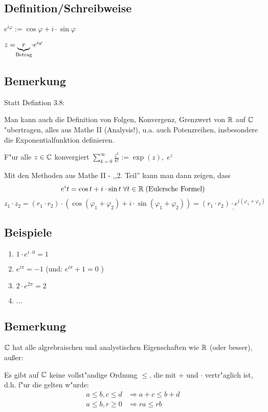 \subsection{Definition/Schreibweise}

$e^{i\varphi}:= \cos \varphi + i \cdot \sin \varphi$

$z= \underbrace{r}_{\mathclap{\text{Betrag}}} \cdot e^{i\varphi}$

\subsection{Bemerkung}

Statt Defintion 3.8:

Man kann auch die Definition von Folgen, Konvergenz, Grenzwert von $\mathbb{R}$ auf $\mathbb{C}$ "ubertragen, alles aus Mathe II (Analysis!), u.a. auch Potenzreihen, insbesondere die Exponentialfunktion definieren.

F"ur alle $z \in \mathbb{C}$ konvergiert $\sum_{k=0}^{\infty}\frac{z^k}{k!} := \exp(z), \; e^z $

Mit den Methoden aus Mathe II - ,,2. Teil'' kann man dann zeigen, dass \[e ^it = \cos t + i \cdot \sin t \; \forall t \in \mathbb{R} \; \text{(Eulersche Formel)}\]
\[z_1\cdot z_2 = (r_1\cdot r_2)\cdot (\cos(\varphi_1 + \varphi_2)+i \cdot \sin (\varphi_1 + \varphi_2)) = \underline{(r_1\cdot r_2) \cdot e^{i (\varphi_1 + \varphi_2)} }\]

\subsection{Beispiele}

\begin{enumerate}
	\item
	$1 \cdot e^{i\cdot 0 } = 1$
	\item
	$e^{i\pi} = -1 $ (und: $e^{i\pi}+1 = 0 $ \smiley)
	\item
	$2 \cdot e^{2\pi} = 2$ 
	\item
	$\ldots$ %
	
\end{enumerate}

\subsection{Bemerkung}

$\mathbb{C}$ hat alle algrebraischen und analystischen Eigenschaften wie $\mathbb{R}$ (oder besser), außer:

Es gibt auf $\mathbb{C}$ keine vollst"andige Ordnung $\leq$, die mit + und $\cdot$ vertr"aglich ist, d.h. f"ur die gelten w"urde:
\begin{align*}
a \leq b, c \leq d&\Rightarrow a+c \leq b+d\\
a \leq b, r \geq 0&\Rightarrow ra \leq rb
\end{align*}